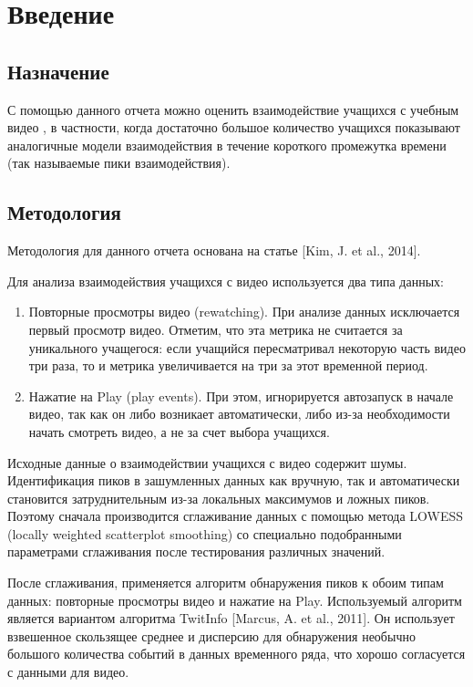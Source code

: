 \chapter{Введение}
\section*{Назначение}
С помощью данного отчета можно оценить взаимодействие учащихся с учебным видео \coursetexttointro, в частности, когда  достаточно большое количество учащихся показывают аналогичные модели взаимодействия в течение короткого промежутка времени (так называемые пики взаимодействия).

\section*{Методология}

Методология для данного отчета основана на статье [Kim, J. et al., 2014]. 

Для анализа взаимодействия учащихся с видео используется два типа данных:
\begin{enumerate}
\item Повторные просмотры видео (rewatching). При анализе данных исключается первый просмотр видео. Отметим, что эта метрика не считается за уникального учащегося: если учащийся пересматривал некоторую часть видео три раза, то и метрика увеличивается на три за этот временной период.
\item Нажатие на Play (play events). При этом, игнорируется автозапуск в начале видео, так как он либо возникает автоматически, либо из-за необходимости начать смотреть видео, а не за счет выбора учащихся.
\end{enumerate}

Исходные данные о взаимодействии учащихся с видео содержит шумы. Идентификация пиков в зашумленных данных как вручную, так и автоматически становится затруднительным из-за локальных максимумов и ложных пиков. Поэтому сначала производится сглаживание данных с помощью метода LOWESS (locally weighted scatterplot smoothing) со специально подобранными параметрами сглаживания после тестирования различных значений.

После сглаживания, применяется алгоритм обнаружения пиков к обоим  типам данных: повторные просмотры видео и нажатие на Play. Используемый алгоритм является вариантом алгоритма TwitInfo [Marcus, A. et al., 2011]. Он использует взвешенное скользящее среднее и дисперсию для обнаружения необычно большого количества событий в данных временного ряда, что хорошо согласуется с данными для видео.  

